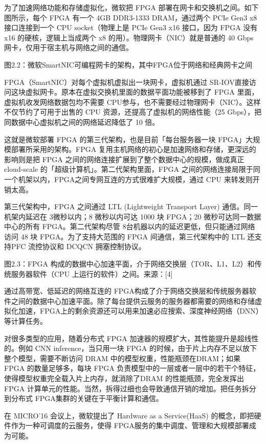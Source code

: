 为了加速网络功能和存储虚拟化，微软把 FPGA 部署在网卡和交换机之间。如下图所示，每个 FPGA 有一个 4GB DDR3-1333 DRAM，通过两个 PCIe Gen3 x8 接口连接到一个 CPU socket（物理上是 PCIe Gen3 x16 接口，因为 FPGA 没有 x16 的硬核，逻辑上当成两个 x8 的用）。物理网卡（NIC）就是普通的 40 Gbps 网卡，仅用于宿主机与网络之间的通信。


图2.2：微软SmartNIC可编程网卡的架构，其中FPGA位于网络和经典网卡之间

FPGA（SmartNIC）对每个虚拟机虚拟出一块网卡，虚拟机通过 SR-IOV直接访问这块虚拟网卡。原本在虚拟交换机里面的数据平面功能被移到了 FPGA 里面，虚拟机收发网络数据包均不需要 CPU参与，也不需要经过物理网卡（NIC）。这样不仅节约了可用于出售的 CPU 资源，还提高了虚拟机的网络性能（25 Gbps），把同数据中心虚拟机之间的网络延迟降低了 10 倍。

这就是微软部署 FPGA 的第三代架构，也是目前「每台服务器一块 FPGA」大规模部署所采用的架构。FPGA 复用主机网络的初心是加速网络和存储，更深远的影响则是把 FPGA 之间的网络连接扩展到了整个数据中心的规模，做成真正 cloud-scale 的「超级计算机」。第二代架构里面，FPGA 之间的网络连接局限于同一个机架以内，FPGA之间专网互连的方式很难扩大规模，通过 CPU 来转发则开销太高。

第三代架构中，FPGA 之间通过 LTL (Lightweight Transport Layer) 通信。同一机架内延迟在 3微秒以内；8 微秒以内可达 1000 块 FPGA；20 微秒可达同一数据中心的所有 FPGA。第二代架构尽管 8台机器以内的延迟更低，但只能通过网络访问 48 块 FPGA。为了支持大范围的 FPGA 间通信，第三代架构中的 LTL 还支持PFC 流控协议和 DCQCN 拥塞控制协议。

图2.3：FPGA 构成的数据中心加速平面，介于网络交换层（TOR、L1、L2）和传统服务器软件（CPU 上运行的软件）之间。来源：[4]

通过高带宽、低延迟的网络互连的 FPGA构成了介于网络交换层和传统服务器软件之间的数据中心加速平面。除了每台提供云服务的服务器都需要的网络和存储虚拟化加速，FPGA上的剩余资源还可以用来加速必应搜索、深度神经网络（DNN）等计算任务。

对很多类型的应用，随着分布式 FPGA 加速器的规模扩大，其性能提升是超线性的。例如 CNN inference，当只用一块 FPGA 的时候，由于片上内存不足以放下整个模型，需要不断访问 DRAM 中的模型权重，性能瓶颈在DRAM；如果 FPGA 的数量足够多，每块 FPGA 负责模型中的一层或者一层中的若干个特征，使得模型权重完全载入片上内存，就消除了DRAM 的性能瓶颈，完全发挥出 FPGA 计算单元的性能。当然，拆得过细也会导致通信开销的增加。把任务拆分到分布式 FPGA集群的关键在于平衡计算和通信。

在 MICRO’16 会议上，微软提出了 Hardware as a Service(HaaS) 的概念，即把硬件作为一种可调度的云服务，使得 FPGA服务的集中调度、管理和大规模部署成为可能。

